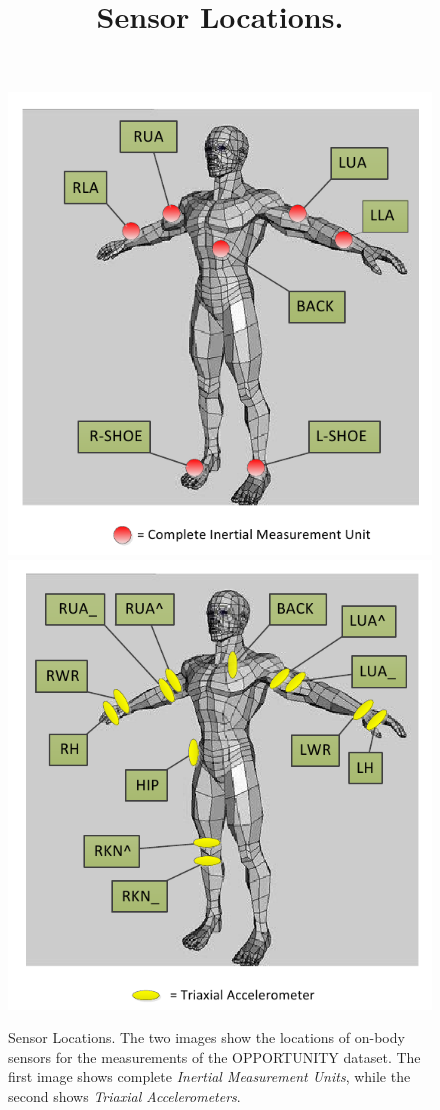 \begin{figure}[ht]
	\centering
	\includegraphics[scale=.29]{figure/Fig1Cl} \hfil
	\includegraphics[scale=.29]{figure/Fig1Cr}
	\title{Sensor Locations.}
	\caption{Sensor Locations. The two images show the locations of on-body sensors for the measurements of the OPPORTUNITY dataset. The first image shows complete \textit{Inertial Measurement Units}, while the second shows \textit{Triaxial Accelerometers}.}
	\label{fig:sensors}
\end{figure}

